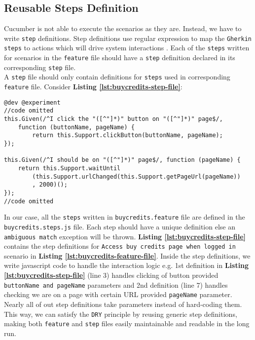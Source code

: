 \subsection{Reusable Steps Definition}
\label{subsec:reusable-steps-definition}

Cucumber is not able to execute the scenarios as they are. Instead, we have to write \texttt{step} definitions. Step definitions use regular expression to map the \texttt{Gherkin steps} to actions which will drive system interactions \cite{stepfile1}. Each of the \texttt{steps} written for scenarios in the \texttt{feature} file should have a \texttt{step} definition declared in its corresponding \texttt{step} file.\\ A \texttt{step} file should only contain definitions for \texttt{steps} used in corresponding \texttt{feature} file. Consider \textbf{Listing \ref{lst:buycredits-step-file}}:\\

\begin{listing}[H]
\begin{verbatim}
@dev @experiment
//code omitted
this.Given(/^I click the "([^"]*)" button on "([^"]*)" page$/,
    function (buttonName, pageName) {
        return this.Support.clickButton(buttonName, pageName);
});

this.Given(/^I should be on "([^"]*)" page$/, function (pageName) {
    return this.Support.waitUntil
        (this.Support.urlChanged(this.Support.getPageUrl(pageName))
        , 2000)();
});
//code omitted
\end{verbatim}
\label{lst:buycredits-step-file}
\end{listing}

In our case, all the \texttt{steps} written in \texttt{buycredits.feature} file are defined in the \texttt{buycredits.steps.js} file. Each step should have a unique definition else an \texttt{ambiguous match} exception will be thrown. \textbf{Listing \ref{lst:buycredits-step-file}} contains the step definitions for \texttt{Access buy credits page when logged in} scenario in \textbf{Listing \ref{lst:buycredits-feature-file}}. Inside the step definitions, we write javascript code to handle the interaction logic e.g. 1st definition in \textbf{Listing \ref{lst:buycredits-step-file}} (line 3) handles clicking of button provided  \texttt{buttonName and pageName} parameters and 2nd definition (line 7) handles checking we are on a page with certain URL provided  \texttt{pageName} parameter. Nearly all of out step definitions take parameters instead of hard-coding them. This way, we can satisfy the \texttt{DRY} principle by reusing generic step definitions, making both  \texttt{feature} and  \texttt{step} files easily maintainable and readable in the long run.

